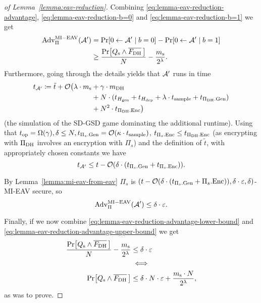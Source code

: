 \begin{proof}[of Lemma~\ref{lemma:eav-reduction}]
	Combining \eqref{eq:lemma-eav-reduction-advantage}, \eqref{eq:lemma-eav-reduction-b=0} and \eqref{eq:lemma-eav-reduction-b=1} we get
	\begin{align} \label{eq:lemma-eav-reduction-advantage-lower-bound}
		\begin{split}
			\mathrm{Adv}_{\Pi}^{\mathrm{MI-EAV}}(\adv') & = \pr{0 \from \adv' \mid b = 0} - \pr{0 \from \adv' \mid b = 1}           \\
			& \ge \frac{\pr{\qs \land \overline{\fdh}\,}}{N} - \frac{\ms}{2^\lambda}.
		\end{split}
	\end{align}
	Furthermore, going through the details yields that $\mathcal{A}'$ runs in time
	\begin{align*}
		\begin{split}
			t_{\mathcal{A}'} \coloneqq \tilde{t} + \mathcal{O}\big(\lambda \cdot m_\mathrm{s} & +  \gamma \cdot m_\mathrm{DH}  \\
			& + N \cdot (t_{H_\mathrm{gen}} + t_{H_\mathrm{dep}} + \lambda \cdot t_{\mathrm{sample}} + t_{\Pi_{\mathrm{DH}}.\mathrm{Gen}})  \\
			& +  N^2 \cdot t_{\Pi_{\mathrm{DH}}.\mathrm{Enc}}\big)
		\end{split}
	\end{align*}
	(the simulation of the SD-GSD game dominating the additional runtime).
	Using that $t_{\mathrm{op}} = \Omega(\gamma), \delta \le N, t_{\Pi_s.\mathrm{Gen}} = \mathcal{O}(\kappa \cdot t_{\mathrm{sample}})$, $t_{\Pi_s.\mathrm{Enc}} \le t_{\Pi_{\mathrm{DH}}.\mathrm{Enc}}$ (as encrypting with $\Pi_{\mathrm{DH}}$ involves an encryption with $\Pi_s$) and the definition of $\tilde{t}$, with appropriately chosen constants we have
	\[
		t_{\mathcal{A}'} \le t - \mathcal{O}(\delta \cdot (t_{\Pi_s.\mathrm{Gen}} + t_{\Pi_s.\mathrm{Enc}})).
	\]

	By Lemma~\ref{lemma:mi-eav-from-eav} $\Pi_s$ is $(t - \mathcal{O}(\delta \cdot (t_{\Pi_s.\mathrm{Gen}} + \Pi_s.\mathrm{Enc})), \delta \cdot \varepsilon, \delta)$-MI-EAV secure, so
	\begin{equation} \label{eq:lemma-eav-reduction-advantage-upper-bound}
		\mathrm{Adv}_{\Pi}^{\mathrm{MI-EAV}}(\mathcal{A}') \le \delta \cdot \varepsilon.
	\end{equation}

	Finally, if we now combine \eqref{eq:lemma-eav-reduction-advantage-lower-bound} and \eqref{eq:lemma-eav-reduction-advantage-upper-bound} we get
	\begin{align*}
		\frac{\pr{\qs \land \overline{\fdh}\,}}{N} - \frac{\ms}{2^\lambda} & \le \delta \cdot \epsilon                                          \\
		                                                                   & \iff                                                               \\
		\pr{\qs \land \overline{\fdh}\,}                                   & \le \delta \cdot N \cdot \epsilon + \frac{\ms \cdot N}{2^\lambda},
	\end{align*}
	as was to prove.
\end{proof}

